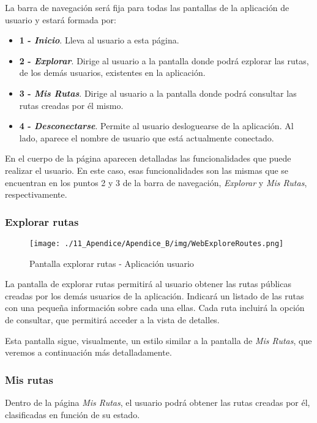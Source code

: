 La barra de navegación será fija para todas las pantallas de la aplicación de usuario y estará formada por:

\begin{itemize}
	\item \textbf{1 - \textit{Inicio}}. Lleva al usuario a esta página.
	\item \textbf{2 - \textit{Explorar}}. Dirige al usuario a la pantalla donde podrá ezplorar las rutas, de los demás usuarios, existentes en la aplicación.
	\item \textbf{3 - \textit{Mis Rutas}}. Dirige al usuario a la pantalla donde podrá consultar las rutas creadas por él mismo.
	\item \textbf{4 - \textit{Desconectarse}}. Permite al usuario desloguearse de la aplicación. Al lado, aparece el nombre de usuario que está actualmente conectado.
\end{itemize}
	
	
En el cuerpo de la página aparecen detalladas las funcionalidades que puede realizar el usuario. En este caso, esas funcionalidades son las mismas que se encuentran en los puntos 2 y 3 de la barra de navegación, \textit{Explorar} y \textit{Mis Rutas}, respectivamente.


\subsubsection*{Explorar rutas}
\begin{figure}[H]
\centering
\texttt{[image: ./11\_Apendice/Apendice\_B/img/WebExploreRoutes.png]}
\caption{Pantalla explorar rutas - Aplicación usuario}
\end{figure}

La pantalla de explorar rutas permitirá al usuario obtener las rutas públicas creadas por los demás usuarios de la aplicación. Indicará un listado de las rutas con una pequeña información sobre cada una ellas. Cada ruta incluirá la opción de consultar, que permitirá acceder a la vista de detalles. 

Esta pantalla sigue, visualmente, un estilo similar a la pantalla de \textit{Mis Rutas}, que veremos a continuación más detalladamente. 


\subsubsection*{Mis rutas}

Dentro de la página \textit{Mis Rutas}, el usuario podrá obtener las rutas creadas por él, clasificadas en función de su estado.

